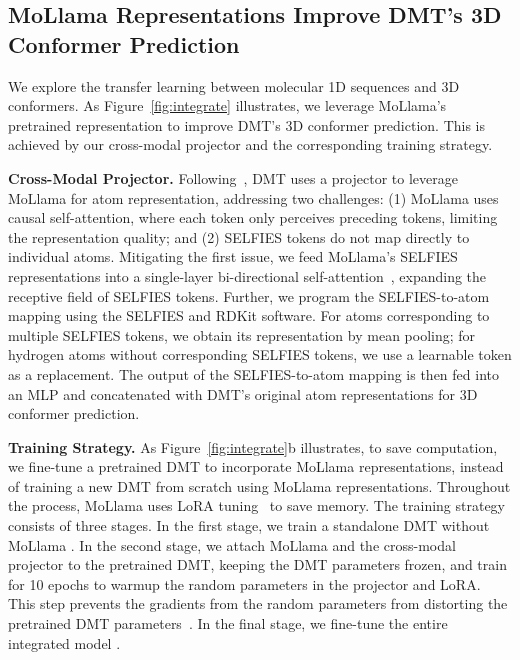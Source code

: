 \vspace{-1.5mm}
\subsection{MoLlama Representations Improve DMT's 3D Conformer Prediction}
\label{sec:integrate}
\vspace{-2mm}
We explore the transfer learning between molecular 1D sequences and 3D conformers. As Figure~\ref{fig:integrate} illustrates, we leverage MoLlama's pretrained representation to improve DMT's 3D conformer prediction. This is achieved by our cross-modal projector and the corresponding training strategy.

\textbf{Cross-Modal Projector.} Following~\cite{liu2023molca}, DMT uses a projector to leverage MoLlama for atom representation, addressing two challenges: (1) MoLlama uses causal self-attention, where each token only perceives preceding tokens, limiting the representation quality; and (2) SELFIES tokens do not map directly to individual atoms. Mitigating the first issue, we feed MoLlama's SELFIES representations into a single-layer bi-directional self-attention~\citep{Transformer}, expanding the receptive field of SELFIES tokens. Further, we program the SELFIES-to-atom mapping using the SELFIES and RDKit software.
For atoms corresponding to multiple SELFIES tokens, we obtain its representation by mean pooling; for hydrogen atoms without corresponding SELFIES tokens, we use a learnable token as a replacement. The output of the SELFIES-to-atom mapping is then fed into an MLP and concatenated with DMT's original atom representations for 3D conformer prediction.

\textbf{Training Strategy.} As Figure~\ref{fig:integrate}b illustrates, to save computation, we fine-tune a pretrained DMT to incorporate MoLlama representations, instead of training a new DMT from scratch using MoLlama representations. Throughout the process, MoLlama uses LoRA tuning~\citep{lora} to save memory. The training strategy consists of three stages. In the first stage, we train a standalone DMT without MoLlama . In the second stage, we attach MoLlama and the cross-modal projector to the pretrained DMT, keeping the DMT parameters frozen, and train for 10 epochs to warmup the random parameters in the projector and LoRA. This step prevents the gradients from the random parameters from distorting the pretrained DMT parameters~\citep{kumar2022finetuning}. In the final stage, we fine-tune the entire integrated model . 

